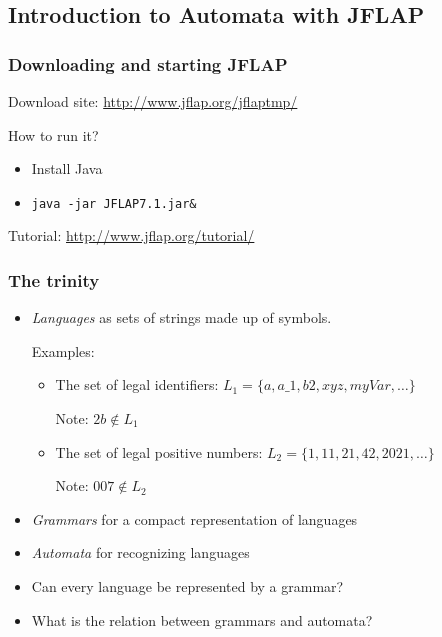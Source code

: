 \documentclass{beamer}
\begin{document}
\subsection{Introduction to Automata with JFLAP}


\begin{frame}[fragile]\frametitle{Downloading and starting JFLAP}


  Download site: \url{http://www.jflap.org/jflaptmp/}

  How to run it?
  \begin{itemize}
  \item Install Java 
  \item \texttt{java -jar JFLAP7.1.jar\&}
  \end{itemize}

  Tutorial: \url{http://www.jflap.org/tutorial/}

\end{frame}


\begin{frame}[fragile]\frametitle{The trinity}

  \begin{itemize}
  \item \emph{Languages} as sets of strings made up of symbols.

    Examples: 

    \begin{itemize}
    \item The set of legal identifiers:
      $L_1 = \{ a, a\_1, b2, xyz, myVar, \dots \}$

      Note: $2b \notin L_1$
    \item The set of legal positive numbers:
      $L_2 = \{ 1, 11, 21, 42, 2021, \dots \}$

      Note: $007 \notin L_2$
    \end{itemize}

    
  \item \emph{Grammars} for a compact representation of languages
  \item \emph{Automata} for recognizing languages
  \end{itemize}

  \begin{itemize}
  \item Can every language be represented by a grammar?
  \item What is the relation between grammars and automata?
  \end{itemize}

\end{frame}
\end{document}
